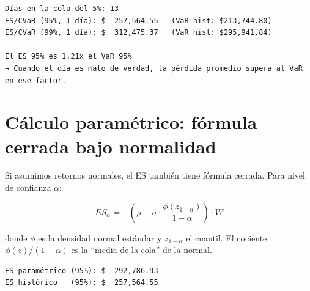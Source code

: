 \documentclass[
  spanish,
  letterpaper,
  DIV=11,
  numbers=noendperiod]{scrreprt}
\newenvironment{Shaded}{\begin{snugshade}}{\end{snugshade}}
\newcommand{\BuiltInTok}[1]{\textcolor[rgb]{0.00,0.23,0.31}{#1}}
\newcommand{\DecValTok}[1]{\textcolor[rgb]{0.68,0.00,0.00}{#1}}
\newcommand{\FloatTok}[1]{\textcolor[rgb]{0.68,0.00,0.00}{#1}}
\newcommand{\NormalTok}[1]{\textcolor[rgb]{0.00,0.23,0.31}{#1}}
\newcommand{\OperatorTok}[1]{\textcolor[rgb]{0.37,0.37,0.37}{#1}}
\newcommand{\SpecialCharTok}[1]{\textcolor[rgb]{0.37,0.37,0.37}{#1}}
\newcommand{\SpecialStringTok}[1]{\textcolor[rgb]{0.13,0.47,0.30}{#1}}
\begin{document}
\begin{verbatim}
Días en la cola del 5%: 13
ES/CVaR (95%, 1 día): $  257,564.55   (VaR hist: $213,744.80)
ES/CVaR (99%, 1 día): $  312,475.37   (VaR hist: $295,941.84)

El ES 95% es 1.21x el VaR 95%
→ Cuando el día es malo de verdad, la pérdida promedio supera al VaR en ese factor.
\end{verbatim}

\section{Cálculo paramétrico: fórmula cerrada bajo
normalidad}\label{cuxe1lculo-paramuxe9trico-fuxf3rmula-cerrada-bajo-normalidad}

Si asumimos retornos normales, el ES también tiene fórmula cerrada. Para
nivel de confianza \(\alpha\):

\[ES_\alpha = -\left(\mu - \sigma \cdot \frac{\phi(z_{1-\alpha})}{1-\alpha}\right) \cdot W\]

donde \(\phi\) es la densidad normal estándar y \(z_{1-\alpha}\) el
cuantil. El cociente \(\phi(z)/(1-\alpha)\) es la ``media de la cola''
de la normal.

\label{es-parametrico}
\begin{Shaded}
\end{Shaded}

\begin{verbatim}
ES paramétrico (95%): $  292,786.93
ES histórico   (95%): $  257,564.55
\end{verbatim}
\end{document}
